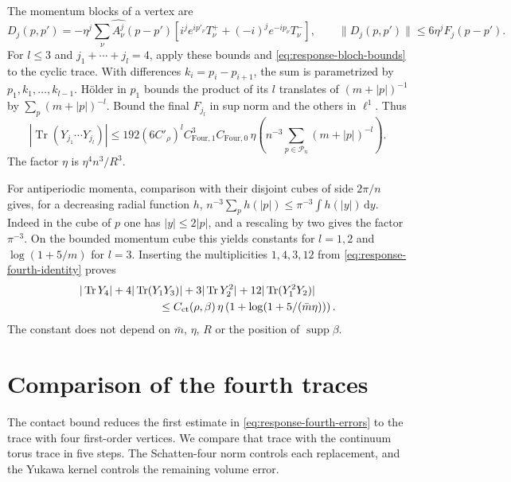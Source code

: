 \documentclass[11pt,letterpaper,reqno]{amsart}
\newcommand{\dd}{\mathrm d}
\DeclareMathOperator{\supp}{supp}
\begin{document}
The momentum blocks of a vertex are
\[
 D_j(p,p')=-\eta^j\sum_\nu\widehat{A_\nu^j}(p-p')
       [i^je^{ip'_\nu}T_\nu^++(-i)^je^{-ip_\nu}T_\nu^-],
 \qquad\|D_j(p,p')\|\le6\eta^jF_j(p-p').
\]
For $l\le3$ and $j_1+\cdots+j_l=4$, apply these bounds
and \eqref{eq:response-bloch-bounds} to the cyclic trace.
With differences $k_i=p_i-p_{i+1}$, the sum is parametrized
by $p_1,k_1,\ldots,k_{l-1}$. H\"older in $p_1$ bounds
the product of its $l$ translates of $(m+|p|)^{-1}$ by
$\sum_p(m+|p|)^{-l}$. Bound the final $F_{j_l}$ in sup
norm and the others in $\ell^1$. Thus
\begin{equation}\label{eq:response-cyclic-contact}
 |\operatorname{Tr}(Y_{j_1}\cdots Y_{j_l})|
   \le192(6C'_\rho)^l C_{\mathrm{Four},1}^3C_{\mathrm{Four},0}\,
          \eta\left(n^{-3}\sum_{p\in\mathcal P_n}(m+|p|)^{-l}\right).
\end{equation}
The factor $\eta$ is $\eta^4n^3/R^3$.

For antiperiodic momenta, comparison with their disjoint
cubes of side $2\pi/n$ gives, for a decreasing radial
function $h$, $n^{-3}\sum_ph(|p|)\le\pi^{-3}\int h(|y|)\,\dd y$.
Indeed in the cube of $p$ one has $|y|\le2|p|$, and a
rescaling by two gives the factor $\pi^{-3}$. On the
bounded momentum cube this yields constants for $l=1,2$
and $\log(1+5/m)$ for $l=3$. Inserting the multiplicities
$1,4,3,12$ from \eqref{eq:response-fourth-identity} proves
\begin{equation}\label{eq:response-contact-bound}
 \begin{split}
 &|\operatorname{Tr}Y_4|+4|\operatorname{Tr}(Y_1Y_3)|
          +3|\operatorname{Tr}Y_2^2|+12|\operatorname{Tr}(Y_1^2Y_2)|\\
 &\hspace{25mm}\le C_{\mathrm{ct}}(\rho,\beta)\,
               \eta\left(1+\log(1+5/(\bar m\eta))\right).
 \end{split}
\end{equation}
The constant does not depend on $\bar m$, $\eta$, $R$ or
the position of $\supp\beta$.

\section{Comparison of the fourth traces}\label{subsec:response-fourth}

The contact bound reduces the first estimate in
\eqref{eq:response-fourth-errors} to the trace with four first-order
vertices. We compare that trace with the continuum torus trace in
five steps. The Schatten-four norm controls each replacement,
and the Yukawa kernel controls the remaining volume error.
\end{document}
